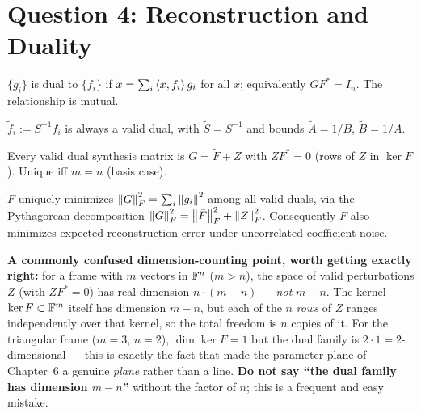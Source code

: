 \section{Question 4: Reconstruction and Duality}
\label{sec:review-q4}

\begin{definition}
\label{rev:def-dual}
$\{g_i\}$ is dual to $\{f_i\}$ if $x=\sum_i\left\langle x, f_i \right\rangle g_i$ for all
$x$; equivalently $GF^*=I_n$. The relationship is mutual.
\end{definition}

\begin{proposition}
\label{rev:prop-canonical}
$\tilde f_i := S^{-1}f_i$ is always a valid dual, with $\tilde S=S^{-1}$
and bounds $\tilde A=1/B$, $\tilde B=1/A$.
\end{proposition}

\begin{theorem}
\label{rev:thm-dual-family}
Every valid dual synthesis matrix is $G=\tilde F+Z$ with $ZF^*=0$
(rows of $Z$ in $\ker F$). Unique iff $m=n$ (basis case).
\end{theorem}

\begin{theorem}
\label{rev:thm-minimal-norm}
$\tilde F$ uniquely minimizes $\left\| G \right\|_F^2=\sum_i\left\| g_i \right\|^2$ among
all valid duals, via the Pythagorean decomposition
$\left\| G \right\|_F^2=\left\| \tilde F \right\|_F^2+\left\| Z \right\|_F^2$. Consequently $\tilde F$
also minimizes expected reconstruction error under uncorrelated
coefficient noise.
\end{theorem}

\begin{reviewbox}
\textbf{A commonly confused dimension-counting point, worth getting
exactly right:} for a frame with $m$ vectors in $\mathbb{F}^n$ ($m>n$), the
space of valid perturbations $Z$ (with $ZF^*=0$) has real dimension
$n\cdot(m-n)$ --- \emph{not} $m-n$. The kernel $\ker F\subset\mathbb{F}^m$
itself has dimension $m-n$, but each of the $n$ \emph{rows} of $Z$
ranges independently over that kernel, so the total freedom is $n$
copies of it. For the triangular frame ($m=3$, $n=2$), $\dim\ker F=1$
but the dual family is $2\cdot1=2$-dimensional --- this is exactly the
fact that made the parameter plane of Chapter~6 a genuine \emph{plane}
rather than a line. \textbf{Do not say ``the dual family has dimension
$m-n$''} without the factor of $n$; this is a frequent and easy
mistake.
\end{reviewbox}

